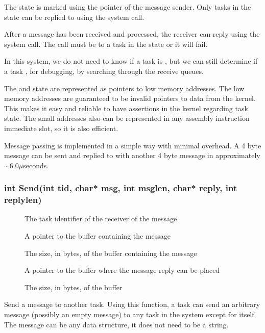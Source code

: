 \documentclass[pdftex,10pt,a4paper]{article}
\begin{document}
The  state is marked using the  pointer
of the message sender. Only tasks in the  state can
be replied to using the  system call.

After a message has been received and processed, the receiver can
reply using the  system call. The  call must be
to a task in the  state or it will fail.

In this system, we do not need to know if a task is
, but we can still determine if a task
, for debugging, by searching through the receive
queues.

The  and  state are represented
as pointers to low memory addresses. The low memory addresses are
guaranteed to be invalid pointers to data from the kernel. This makes
it easy and reliable to have assertions in the kernel regarding task
state. The small addresses also can be represented in any assembly
instruction immediate slot, so it is also efficient.

Message passing is implemented in a simple way with minimal
overhead. A 4 byte message can be sent and replied to with another 4
byte message in approximately $\sim6.0\mu$seconds.


\subsubsection*{int Send(int tid, char* msg, int msglen, char* reply, int replylen)}

\begin{description}
\item[] The task identifier of the receiver of the message
\item[] A pointer to the buffer containing the message
\item[] The size, in bytes, of the buffer containing the message
\item[] A pointer to the buffer where the message reply can
  be placed
\item[] The size, in bytes, of the  buffer
\end{description}

Send a message to another task. Using this function, a task can send an
arbitrary message (possibly an empty message) to any task in the
system except for itself. The message can be any data structure, it
does not need to be a string.
\end{document}
